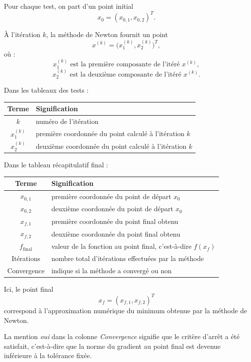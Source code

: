 \documentclass[a4paper,12pt]{article}
\begin{document}
	Pour chaque test, on part d’un point initial
	\[
	x_0=(x_{0,1},x_{0,2})^T.
	\]
	
	À l’itération \(k\), la méthode de Newton fournit un point
	\[
	x^{(k)}=\bigl(x_1^{(k)},x_2^{(k)}\bigr)^T,
	\]
	où :
	\[
	x_1^{(k)} \text{ est la première composante de l’itéré } x^{(k)},
	\]
	\[
	x_2^{(k)} \text{ est la deuxième composante de l’itéré } x^{(k)}.
	\]
	
	Dans les tableaux des tests :
	
	\begin{center}
		\begin{tabular}{cl}
			\toprule
			Terme & Signification \\
			\midrule
			\(k\) & numéro de l’itération \\
			\(x_1^{(k)}\) & première coordonnée du point calculé à l’itération \(k\) \\
			\(x_2^{(k)}\) & deuxième coordonnée du point calculé à l’itération \(k\) \\
			\bottomrule
		\end{tabular}
	\end{center}
	
	Dans le tableau récapitulatif final :
	
	\begin{center}
		\begin{tabular}{cl}
			\toprule
			Terme & Signification \\
			\midrule
			\(x_{0,1}\)  & première coordonnée du point de départ \(x_0\) \\
			\(x_{0,2}\) & deuxième coordonnée du point de départ \(x_0\) \\
			\(x_{f,1}\) & première coordonnée du point final obtenu \\
			\(x_{f,2}\) & deuxième coordonnée du point final obtenu \\
			\(f_{\mathrm{final}}\) & valeur de la fonction au point final, c’est-à-dire \(f(x_f)\) \\
			Itérations & nombre total d’itérations effectuées par la méthode \\
			Convergence & indique si la méthode a convergé ou non \\
			\bottomrule
		\end{tabular}
	\end{center}
	
	Ici, le point final
	\[
	x_f=(x_{f,1},x_{f,2})^T
	\]
	correspond à l’approximation numérique du minimum obtenue par la méthode de Newton.
	
	La mention \emph{oui} dans la colonne \emph{Convergence} signifie que le critère d’arrêt a été satisfait, c’est-à-dire que la norme du gradient au point final est devenue inférieure à la tolérance fixée.
	
\end{document}
